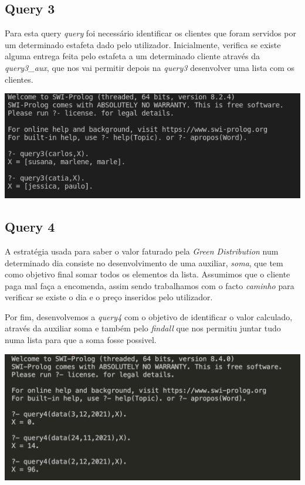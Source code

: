 \documentclass[a4paper,12pt]{article}
\begin{document}
    \subsection{Query 3}
        Para esta query \emph{query} foi necessário identificar os clientes que foram servidos por um determinado estafeta dado pelo utilizador. Inicialmente, verifica se existe alguma entrega feita pelo estafeta a um determinado cliente através da \emph{query3\_aux}, que nos vai permitir depois na \emph{query3} desenvolver uma lista com os clientes.\par
    
        \begin{center}
            \includegraphics[scale=0.6]{imagens/query3.png}
        \end{center}
        
    \subsection{Query 4}
        A estratégia usada para saber o valor faturado pela \emph{Green Distribution} num determinado dia consiste no desenvolvimento de uma auxiliar, \emph{soma}, que tem como objetivo final somar todos os elementos da lista. Assumimos que o cliente paga mal faça a encomenda, assim sendo trabalhamos com o facto \emph{caminho} para verificar se existe o dia e o preço inseridos pelo utilizador.\par
        Por fim, desenvolvemos a \emph{query4} com o objetivo de  identificar o valor calculado, através da auxiliar soma e também pelo \emph{findall} que nos permitiu juntar tudo numa lista para que a soma fosse possivel.\par
    
        \begin{center}
            \includegraphics[scale=0.6]{imagens/query4.png}
        \end{center}
    
\end{document}
